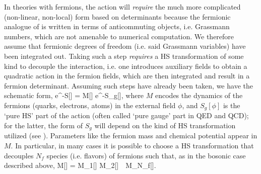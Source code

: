\documentclass[../main.tex]{subfiles}
\begin{document}
In theories with fermions, the action will {\it require} the much more complicated (non-linear, non-local) form based on
determinants because the fermionic analogue of  is written in terms of anticommuting objects, i.e. Grassmann numbers,
which are not amenable to numerical computation.
We therefore assume that fermionic degrees of freedom (i.e. said Grassmann variables) have been integrated out. Taking such a step {\it requires} a HS
transformation of some kind to decouple the interaction, i.e. one introduces auxiliary fields to obtain a quadratic action in the fermion fields, which
are then integrated and result in a fermion determinant. Assuming such steps have already been taken, we have the schematic form,
%
\beq
\label{Eq:FermionAction}
{\rm e}^{-S[\phi]} = \det M[\phi] {\rm e}^{-S_g[\phi]},
\eeq
%
where $M$ encodes the dynamics of the fermions (quarks, electrons, atoms) in the external field $\phi$, and $S_g[\phi]$
is the `pure HS' part of the action (often called `pure gauge' part in QED and QCD); for the
latter, the form of $S_g$ will depend on the kind of HS transformation utilized (see ).
Parameters like the fermion mass and chemical potential appear in $M$. In particular, in many cases it is possible to choose a HS transformation that decouples $N_f$ species
(i.e. flavors) of fermions such that, as in the bosonic case described above,
%
\beq
\label{Eq:FermionDeterminant}
\det M[\phi] = \det M_1[\phi] \det M_2[\phi]\, \cdots\,  \det M_{N_f}[\phi].
\eeq
%
%
\end{document}
